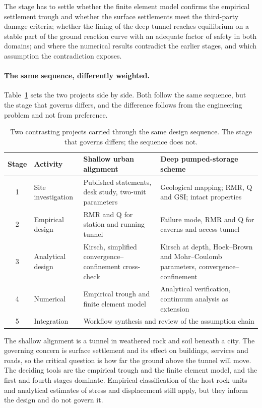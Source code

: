 The stage has to settle whether the finite element model confirms the
empirical settlement trough and whether the surface settlements meet the
third-party damage criteria; whether the lining of the deep tunnel reaches
equilibrium on a stable part of the ground reaction curve with an adequate
factor of safety in both domains; and where the numerical results contradict
the earlier stages, and which assumption the contradiction exposes.

\paragraph{The same sequence, differently weighted.}
Table~\ref{tab:workflow-stages} sets the two projects side by side. Both
follow the same sequence, but the stage that governs differs, and the
difference follows from the engineering problem and not from preference.

\begin{table}[htbp]
\caption{Two contrasting projects carried through the same design sequence. The stage that governs differs; the sequence does not.}
\label{tab:workflow-stages}
\centering
\small
\begin{tabularx}{\textwidth}{c l X X}
\toprule
\textbf{Stage} & \textbf{Activity} & \textbf{Shallow urban alignment} & \textbf{Deep pumped-storage scheme} \\
\midrule
1 & Site investigation & Published statements, desk study, two-unit parameters & Geological mapping; RMR, Q and GSI; intact properties \\
2 & Empirical design & RMR and Q for station and running tunnel & Failure mode, RMR and Q for caverns and access tunnel \\
3 & Analytical design & Kirsch, simplified convergence--confinement cross-check & Kirsch at depth, Hoek--Brown and Mohr--Coulomb parameters, convergence--confinement \\
4 & Numerical & Empirical trough and finite element model & Analytical verification, continuum analysis as extension \\
5 & Integration & \multicolumn{2}{c}{Workflow synthesis and review of the assumption chain} \\
\bottomrule
\end{tabularx}
\end{table}

The shallow alignment is a tunnel in weathered rock and soil beneath a city.
The governing concern is surface settlement and its effect on buildings,
services and roads, so the critical question is how far the ground above the
tunnel will move. The deciding tools are the empirical trough and the finite
element model, and the first and fourth stages dominate. Empirical
classification of the host rock units and analytical estimates of stress and
displacement still apply, but they inform the design and do not govern it.

